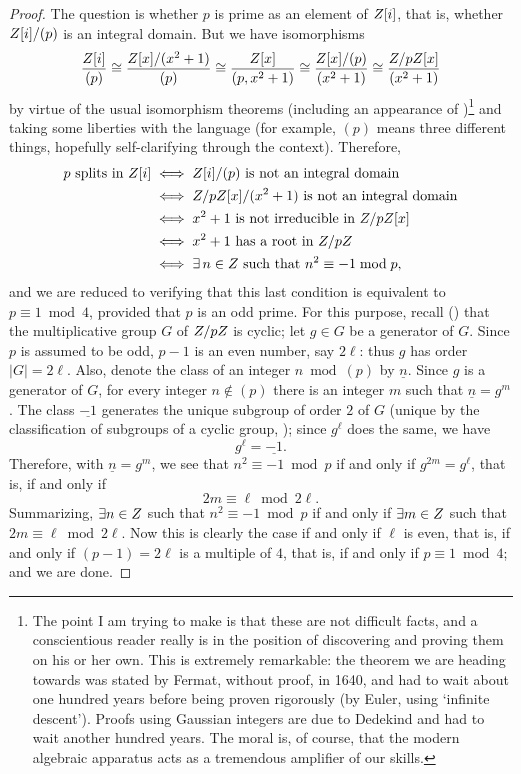 \begin{proof}
  The question is whether $p$ is prime as an element of $Z[i]$, that
  is, whether $Z[i]/(p)$ is an integral domain. But we have
  isomorphisms
  \[\frac{Z[i]}{(p)} \cong \frac{Z[x]/(x^2+1)}{(p)} \cong
    \frac{Z[x]}{(p, x^2+1)} \cong \frac{Z[x]/(p)}{(x^2+1)} \cong
    \frac{Z/pZ[x]}{(x^2+1)}\] by virtue of the usual isomorphism
  theorems (including an appearance of
  )\footnote{The point I am trying to make is that
    these are not difficult facts, and a conscientious reader really
    is in the position of discovering and proving them on his or her
    own. This is extremely remarkable: the theorem we are heading
    towards was stated by Fermat, without proof, in 1640, and had to
    wait about one hundred years before being proven rigorously (by
    Euler, using `infinite descent'). Proofs using Gaussian integers
    are due to Dedekind and had to wait another hundred years. The
    moral is, of course, that the modern algebraic apparatus acts as a
    tremendous amplifier of our skills.} and taking some liberties
  with the language (for example, $(p)$ means three different things,
  hopefully self-clarifying through the context). Therefore,
  \begin{align*}
    p \text{ splits in } Z[i]
    &\iff Z[i]/(p) \text{ is not an integral domain} \\
    &\iff Z/pZ[x]/(x^2+1) \text{ is not an integral domain}
    \\
    &\iff x^2 + 1 \text{ is not irreducible in } Z/pZ[x] \\
    &\iff x^2 + 1 \text{ has a root in } Z/pZ \\
    &\iff \exists\, n \in Z \text{ such that } n^2 \equiv -1 \bmod p,
  \end{align*}
  and we are reduced to verifying that this last condition is
  equivalent to $p \equiv 1 \bmod 4$, provided that $p$ is an odd
  prime.  For this purpose, recall () that the
  multiplicative group $G$ of $Z/pZ$ is cyclic; let $g \in G$ be a
  generator of $G$. Since $p$ is assumed to be odd, $p - 1$ is an even
  number, say $2\ell$: thus $g$ has order $|G| = 2\ell$. Also, denote
  the class of an integer $n \bmod (p)$ by $\underline{n}$. Since $g$
  is a generator of $G$, for every integer $n \notin (p)$ there is an
  integer $m$ such that $\underline{n} = g^m$.  The class
  $\underline{-1}$ generates the unique subgroup of order $2$ of $G$
  (unique by the classification of subgroups of a cyclic group,
  ); since $g^\ell$ does the same,
  we have
  \[g^\ell = \underline{-1}.\] Therefore, with $\underline{n} = g^m$,
  we see that $n^2 \equiv -1 \bmod p$ if and only if
  $g^{2m} = g^\ell$, that is, if and only if
  \[2m \equiv \ell \bmod 2\ell.\] Summarizing, $\exists n \in Z$ such
  that $n^2 \equiv -1 \bmod p$ if and only if $\exists m \in Z$ such
  that $2m \equiv \ell \bmod 2\ell$. Now this is clearly the case if
  and only if $\ell$ is even, that is, if and only if
  $(p - 1) = 2\ell$ is a multiple of $4$, that is, if and only if
  $p \equiv 1 \bmod 4$; and we are done.
\end{proof}
